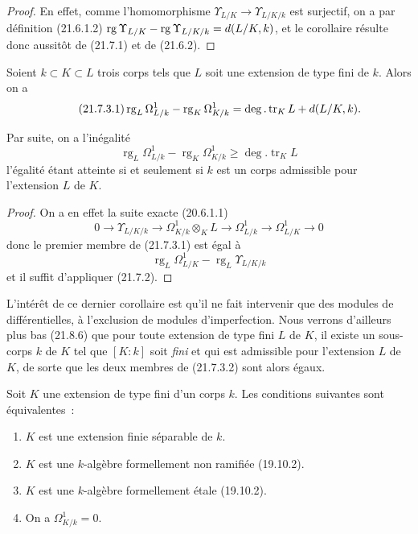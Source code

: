 \begin{proof}
En effet, comme l'homomorphisme
$\Upsilon_{L/K}\to\Upsilon_{L/K/k}$ est surjectif, on a par définition
(21.6.1.2)
$\operatorname{rg}\Upsilon_{L/K}-\operatorname{rg}\Upsilon_{L/K/k}
=d(L/K,k)$, et le corollaire résulte donc aussitôt de (21.7.1) et de
(21.6.2).
\end{proof}

\begin{corollary}[21.7.3]
\label{0.21.7.3-fr}
Soient $k\subset K\subset L$ trois corps tels que $L$ soit une extension de
type fini de $k$. Alors on a
\begin{equation}
\tag{21.7.3.1}
\label{0.21.7.3.1-fr}
\operatorname{rg}_L\Omega^1_{L/k}-\operatorname{rg}_K\Omega^1_{K/k}
=\deg.\operatorname{tr}_K L+d(L/K,k).
\end{equation}

Par suite, on a l'inégalité
\begin{equation}
\tag{21.7.3.2}
\label{0.21.7.3.2-fr}
\operatorname{rg}_L\Omega^1_{L/k}-\operatorname{rg}_K\Omega^1_{K/k}
\geqslant\deg.\operatorname{tr}_K L
\end{equation}
l'égalité étant atteinte si et seulement si $k$ est un corps admissible pour
l'extension $L$ de $K$.
\end{corollary}

\begin{proof}
On a en effet la suite exacte (20.6.1.1)
\[
0\to\Upsilon_{L/K/k}\to\Omega^1_{K/k}\otimes_KL\to\Omega^1_{L/k}
\to\Omega^1_{L/K}\to0
\]
donc le premier membre de (21.7.3.1) est égal à
\[
\operatorname{rg}_L\Omega^1_{L/K}-\operatorname{rg}_L\Upsilon_{L/K/k}
\]
et il suffit d'appliquer (21.7.2).
\end{proof}

L'intérêt de ce dernier corollaire est qu'il ne fait intervenir que des
modules de différentielles, à l'exclusion de modules d'imperfection. Nous
verrons d'ailleurs plus bas (21.8.6) que pour toute extension de type fini
$L$ de $K$, il existe un sous-corps $k$ de $K$ tel que $[K:k]$ soit \emph{fini} et
qui est admissible pour l'extension $L$ de $K$, de sorte que les deux membres
de (21.7.3.2) sont alors égaux.

\begin{corollary}[21.7.4]
\label{0.21.7.4-fr}
Soit $K$ une extension de type fini d'un corps $k$. Les conditions suivantes
sont équivalentes~:
\begin{enumerate}
  \item[\rm a)] $K$ est une extension finie séparable de $k$.
  \item[\rm b)] $K$ est une $k$-algèbre formellement non ramifiée \textup{(19.10.2)}.
  \item[\rm c)] $K$ est une $k$-algèbre formellement étale \textup{(19.10.2)}.
  \item[\rm d)] On a $\Omega^1_{K/k}=0$.
\end{enumerate}
\end{corollary}

